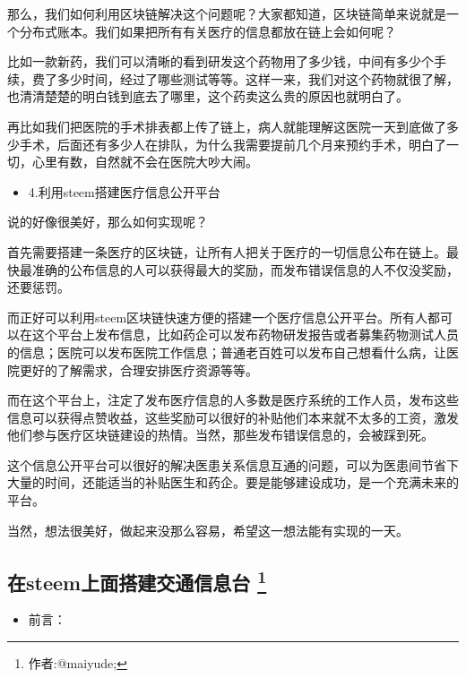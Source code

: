 \documentclass[]{ctexbook}
\providecommand{\tightlist}{%
  \setlength{\itemsep}{0pt}\setlength{\parskip}{0pt}}
\begin{document}
那么，我们如何利用区块链解决这个问题呢？大家都知道，区块链简单来说就是一个分布式账本。我们如果把所有有关医疗的信息都放在链上会如何呢？

比如一款新药，我们可以清晰的看到研发这个药物用了多少钱，中间有多少个手续，费了多少时间，经过了哪些测试等等。这样一来，我们对这个药物就很了解，也清清楚楚的明白钱到底去了哪里，这个药卖这么贵的原因也就明白了。

再比如我们把医院的手术排表都上传了链上，病人就能理解这医院一天到底做了多少手术，后面还有多少人在排队，为什么我需要提前几个月来预约手术，明白了一切，心里有数，自然就不会在医院大吵大闹。

\begin{itemize}
\tightlist
\item
  4.利用steem搭建医疗信息公开平台
\end{itemize}

说的好像很美好，那么如何实现呢？

首先需要搭建一条医疗的区块链，让所有人把关于医疗的一切信息公布在链上。最快最准确的公布信息的人可以获得最大的奖励，而发布错误信息的人不仅没奖励，还要惩罚。

而正好可以利用steem区块链快速方便的搭建一个医疗信息公开平台。所有人都可以在这个平台上发布信息，比如药企可以发布药物研发报告或者募集药物测试人员的信息；医院可以发布医院工作信息；普通老百姓可以发布自己想看什么病，让医院更好的了解需求，合理安排医疗资源等等。

而在这个平台上，注定了发布医疗信息的人多数是医疗系统的工作人员，发布这些信息可以获得点赞收益，这些奖励可以很好的补贴他们本来就不太多的工资，激发他们参与医疗区块链建设的热情。当然，那些发布错误信息的，会被踩到死。

这个信息公开平台可以很好的解决医患关系信息互通的问题，可以为医患间节省下大量的时间，还能适当的补贴医生和药企。要是能够建设成功，是一个充满未来的平台。

当然，想法很美好，做起来没那么容易，希望这一想法能有实现的一天。

\hypertarget{steem}{%
\subsection[在steem上面搭建交通信息台 ]{\texorpdfstring{在steem上面搭建交通信息台 \footnote{作者:@maiyude;}}{在steem上面搭建交通信息台 }}\label{steem}}

\begin{itemize}
\tightlist
\item
  前言：
\end{itemize}
\end{document}
